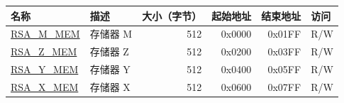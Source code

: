 \label{regdesc:RSAmemory}
\begin{longtable}{ | l | l | r | r | r | l | }

\hline
\rowcolor{lightgray}
\textbf{名称} & \textbf{描述} &  \textbf{大小（字节）} & \textbf{起始地址} & \textbf{结束地址} & \textbf{访问} \\ \hline
\hyperref[regdesc:RSAmemory]{RSA\_M\_MEM} & 存储器 M  & 512   & 0x0000 & 0x01FF & R/W \\ \hline
\hyperref[regdesc:RSAmemory]{RSA\_Z\_MEM} & 存储器 Z  & 512  & 0x0200 & 0x03FF & R/W \\ \hline
\hyperref[regdesc:RSAmemory]{RSA\_Y\_MEM} & 存储器 Y  & 512  & 0x0400 & 0x05FF & R/W \\ \hline
\hyperref[regdesc:RSAmemory]{RSA\_X\_MEM} & 存储器 X  & 512  & 0x0600 & 0x07FF & R/W \\ \hline

\end{longtable}
